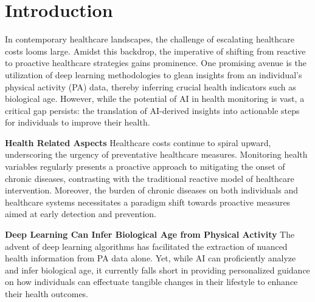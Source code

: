 \section{Introduction}
\label{sec:introduction}





In contemporary healthcare landscapes, the challenge of escalating healthcare costs looms large. Amidst this backdrop, the imperative of shifting from reactive to proactive healthcare strategies gains prominence. One promising avenue is the utilization of deep learning methodologies to glean insights from an individual's physical activity (PA) data, thereby inferring crucial health indicators such as biological age. However, while the potential of AI in health monitoring is vast, a critical gap persists: the translation of AI-derived insights into actionable steps for individuals to improve their health.

\textbf{Health Related Aspects} Healthcare costs continue to spiral upward, underscoring the urgency of preventative healthcare measures. Monitoring health variables regularly presents a proactive approach to mitigating the onset of chronic diseases, contrasting with the traditional reactive model of healthcare intervention. Moreover, the burden of chronic diseases on both individuals and healthcare systems necessitates a paradigm shift towards proactive measures aimed at early detection and prevention.

\textbf{Deep Learning Can Infer Biological Age from Physical Activity} The advent of deep learning algorithms has facilitated the extraction of nuanced health information from PA data alone. Yet, while AI can proficiently analyze and infer biological age, it currently falls short in providing personalized guidance on how individuals can effectuate tangible changes in their lifestyle to enhance their health outcomes.

